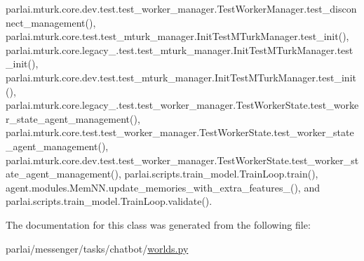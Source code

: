 parlai.\+mturk.\+core.\+dev.\+test.\+test\+\_\+worker\+\_\+manager.\+Test\+Worker\+Manager.\+test\+\_\+disconnect\+\_\+management(), parlai.\+mturk.\+core.\+test.\+test\+\_\+mturk\+\_\+manager.\+Init\+Test\+M\+Turk\+Manager.\+test\+\_\+init(), parlai.\+mturk.\+core.\+legacy\+\_.\+test.\+test\+\_\+mturk\+\_\+manager.\+Init\+Test\+M\+Turk\+Manager.\+test\+\_\+init(), parlai.\+mturk.\+core.\+dev.\+test.\+test\+\_\+mturk\+\_\+manager.\+Init\+Test\+M\+Turk\+Manager.\+test\+\_\+init(), parlai.\+mturk.\+core.\+legacy\+\_.\+test.\+test\+\_\+worker\+\_\+manager.\+Test\+Worker\+State.\+test\+\_\+worker\+\_\+state\+\_\+agent\+\_\+management(), parlai.\+mturk.\+core.\+test.\+test\+\_\+worker\+\_\+manager.\+Test\+Worker\+State.\+test\+\_\+worker\+\_\+state\+\_\+agent\+\_\+management(), parlai.\+mturk.\+core.\+dev.\+test.\+test\+\_\+worker\+\_\+manager.\+Test\+Worker\+State.\+test\+\_\+worker\+\_\+state\+\_\+agent\+\_\+management(), parlai.\+scripts.\+train\+\_\+model.\+Train\+Loop.\+train(), agent.\+modules.\+Mem\+N\+N.\+update\+\_\+memories\+\_\+with\+\_\+extra\+\_\+features\+\_\+(), and parlai.\+scripts.\+train\+\_\+model.\+Train\+Loop.\+validate().



The documentation for this class was generated from the following file\+:\begin{DoxyCompactItemize}
\item 
parlai/messenger/tasks/chatbot/\hyperlink{parlai_2messenger_2tasks_2chatbot_2worlds_8py}{worlds.\+py}\end{DoxyCompactItemize}
